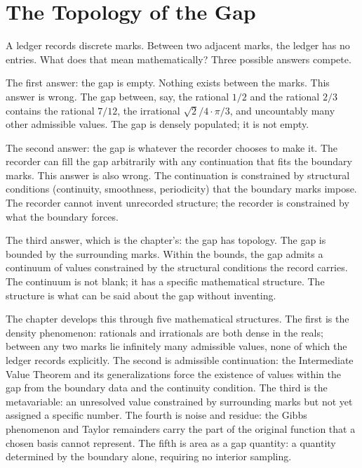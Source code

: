 \chapter{The Topology of the Gap}
\label{chap:topology-of-the-gap}


\begin{chapteressay}

A ledger records discrete marks. Between two adjacent marks, the ledger
has no entries. What does that mean mathematically? Three possible
answers compete.

The first answer: the gap is empty. Nothing exists between the marks.
This answer is wrong. The gap between, say, the rational $1/2$ and the
rational $2/3$ contains the rational $7/12$, the irrational $\sqrt{2}/4
\cdot \pi/3$, and uncountably many other admissible values. The gap is
densely populated; it is not empty.

The second answer: the gap is whatever the recorder chooses to make it.
The recorder can fill the gap arbitrarily with any continuation that
fits the boundary marks. This answer is also wrong. The continuation
is constrained by structural conditions (continuity, smoothness,
periodicity) that the boundary marks impose. The recorder cannot
invent unrecorded structure; the recorder is constrained by what the
boundary forces.

The third answer, which is the chapter's: the gap has topology. The
gap is bounded by the surrounding marks. Within the bounds, the gap
admits a continuum of values constrained by the structural conditions
the record carries. The continuum is not blank; it has a specific
mathematical structure. The structure is what can be said about the
gap without inventing.

The chapter develops this through five mathematical structures. The
first is the density phenomenon: rationals and irrationals are both
dense in the reals; between any two marks lie infinitely many
admissible values, none of which the ledger records explicitly. The
second is admissible continuation: the Intermediate Value Theorem
and its generalizations force the existence of values within the
gap from the boundary data and the continuity condition. The third
is the metavariable: an unresolved value constrained by surrounding
marks but not yet assigned a specific number. The fourth is noise
and residue: the Gibbs phenomenon and Taylor remainders carry the
part of the original function that a chosen basis cannot represent.
The fifth is area as a gap quantity: a quantity determined by the
boundary alone, requiring no interior sampling.


\end{chapteressay}
